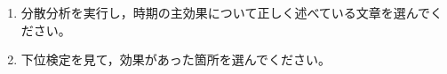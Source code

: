 \begin{enumerate}
	\item 分散分析を実行し，時期の主効果について正しく述べている文章を選んでください。
	\item 下位検定を見て，効果があった箇所を選んでください。
\end{enumerate}
